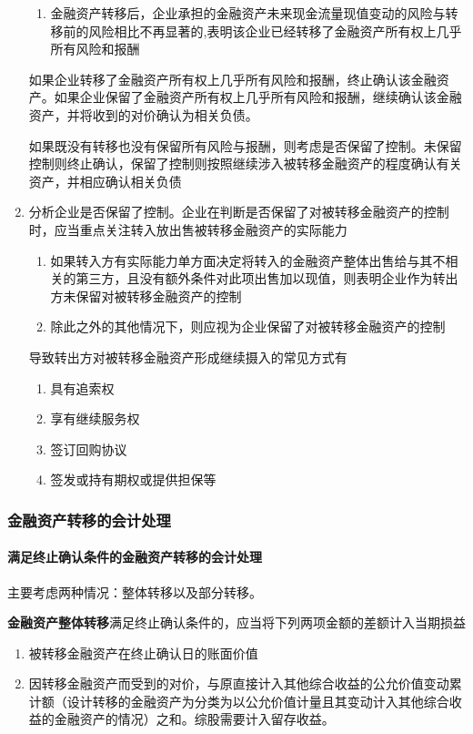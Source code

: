 \documentclass[UTF8,12pt]{ctexart}
\numberwithin{equation}{section} %
\numberwithin{figure}{section}
\numberwithin{table}{section}
\begin{document}
\begin{enumerate}
\begin{enumerate}
			\item 金融资产转移后，企业承担的金融资产未来现金流量现值变动的风险与转移前的风险相比不再显著的,表明该企业已经转移了金融资产所有权上几乎所有风险和报酬
		\end{enumerate}
	
		如果企业转移了金融资产所有权上几乎所有风险和报酬，终止确认该金融资产。如果企业保留了金融资产所有权上几乎所有风险和报酬，继续确认该金融资产，并将收到的对价确认为相关负债。
		
		如果既没有转移也没有保留所有风险与报酬，则考虑是否保留了控制。未保留控制则终止确认，保留了控制则按照继续涉入被转移金融资产的程度确认有关资产，并相应确认相关负债
		
		\item 分析企业是否保留了控制。企业在判断是否保留了对被转移金融资产的控制时，应当重点关注转入放出售被转移金融资产的实际能力
		\begin{enumerate}
			\item 如果转入方有实际能力单方面决定将转入的金融资产整体出售给与其不相关的第三方，且没有额外条件对此项出售加以现值，则表明企业作为转出方未保留对被转移金融资产的控制
			
			\item 除此之外的其他情况下，则应视为企业保留了对被转移金融资产的控制
		\end{enumerate}
	
		导致转出方对被转移金融资产形成继续摄入的常见方式有
		\begin{enumerate}
			\item 具有追索权
			
			\item 享有继续服务权
			
			\item 签订回购协议
			
			\item 签发或持有期权或提供担保等
		\end{enumerate}
	\end{enumerate}
	
	\subsubsection{金融资产转移的会计处理}
	\paragraph{满足终止确认条件的金融资产转移的会计处理} 主要考虑两种情况：整体转移以及部分转移。
	
	\textbf{金融资产整体转移}满足终止确认条件的，应当将下列两项金额的差额计入当期损益
	\begin{enumerate}
		\item 被转移金融资产在终止确认日的账面价值
		
		\item 因转移金融资产而受到的对价，与原直接计入其他综合收益的公允价值变动累计额（设计转移的金融资产为分类为以公允价值计量且其变动计入其他综合收益的金融资产的情况）之和。综股需要计入留存收益。
	\end{enumerate}
\end{document}
